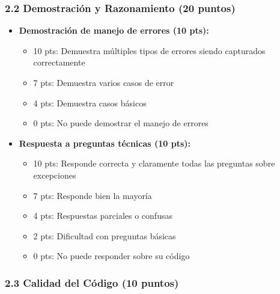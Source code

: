 \documentclass[12pt,a4paper]{article}
\begin{document}
\subsubsection{2.2 Demostración y Razonamiento (20 puntos)}

\begin{itemize}[leftmargin=*]
    \item \textbf{Demostración de manejo de errores (10 pts):}
    \begin{itemize}
        \item 10 pts: Demuestra múltiples tipos de errores siendo capturados correctamente
        \item 7 pts: Demuestra varios casos de error
        \item 4 pts: Demuestra casos básicos
        \item 0 pts: No puede demostrar el manejo de errores
    \end{itemize}
    
    \item \textbf{Respuesta a preguntas técnicas (10 pts):}
    \begin{itemize}
        \item 10 pts: Responde correcta y claramente todas las preguntas sobre excepciones
        \item 7 pts: Responde bien la mayoría
        \item 4 pts: Respuestas parciales o confusas
        \item 2 pts: Dificultad con preguntas básicas
        \item 0 pts: No puede responder sobre su código
    \end{itemize}
\end{itemize}

\subsubsection{2.3 Calidad del Código (10 puntos)}
\end{document}
